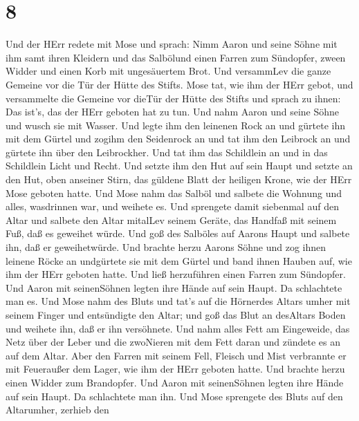 \hypertarget{section-7}{%
\section{8}\label{section-7}}

 Und der HErr redete mit Mose und sprach:  Nimm
Aaron und seine Söhne mit ihm samt ihren Kleidern und das Salbölund
einen Farren zum Sündopfer, zween Widder und einen Korb mit ungesäuertem
Brot.  Und versammLev die ganze Gemeine vor die Tür der
Hütte des Stifts.  Mose tat, wie ihm der HErr gebot, und
versammelte die Gemeine vor dieTür der Hütte des Stifts  und
sprach zu ihnen: Das ist's, das der HErr geboten hat zu tun.
 Und nahm Aaron und seine Söhne und wusch sie mit Wasser.
 Und legte ihm den leinenen Rock an und gürtete ihn mit dem
Gürtel und zogihm den Seidenrock an und tat ihm den Leibrock an und
gürtete ihn über den Leibrockher.  Und tat ihm das
Schildlein an und in das Schildlein Licht und Recht.  Und
setzte ihm den Hut auf sein Haupt und setzte an den Hut, oben anseiner
Stirn, das güldene Blatt der heiligen Krone, wie der HErr Mose geboten
hatte.  Und Mose nahm das Salböl und salbete die Wohnung
und alles, wasdrinnen war, und weihete es.  Und sprengete
damit siebenmal auf den Altar und salbete den Altar mitalLev seinem
Geräte, das Handfaß mit seinem Fuß, daß es geweihet würde. 
Und goß des Salböles auf Aarons Haupt und salbete ihn, daß er
geweihetwürde.  Und brachte herzu Aarons Söhne und zog
ihnen leinene Röcke an undgürtete sie mit dem Gürtel und band ihnen
Hauben auf, wie ihm der HErr geboten hatte.  Und ließ
herzuführen einen Farren zum Sündopfer. Und Aaron mit seinenSöhnen
legten ihre Hände auf sein Haupt.  Da schlachtete man es.
Und Mose nahm des Bluts und tat's auf die Hörnerdes Altars umher mit
seinem Finger und entsündigte den Altar; und goß das Blut an desAltars
Boden und weihete ihn, daß er ihn versöhnete.  Und nahm
alles Fett am Eingeweide, das Netz über der Leber und die zwoNieren mit
dem Fett daran und zündete es an auf dem Altar.  Aber den
Farren mit seinem Fell, Fleisch und Mist verbrannte er mit Feueraußer
dem Lager, wie ihm der HErr geboten hatte.  Und brachte
herzu einen Widder zum Brandopfer. Und Aaron mit seinenSöhnen legten
ihre Hände auf sein Haupt.  Da schlachtete man ihn. Und
Mose sprengete des Bluts auf den Altarumher,  zerhieb den
